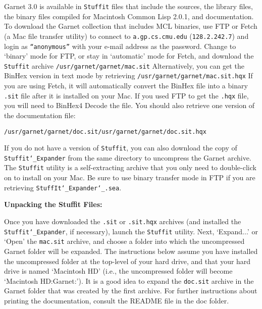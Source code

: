 \documentclass{report}
\begin{document}
Garnet 3.0 is available in \texttt{Stuffit} files that include the
sources, the library files, the binary files compiled for Macintosh
Common Lisp 2.0.1, and documentation.  To download the Garnet
collection that includes MCL binaries, use FTP or Fetch (a Mac file
transfer utility) to connect to \texttt{a.gp.cs.cmu.edu}
(\texttt{128.2.242.7}) and login as \texttt{``anonymous''} with your e-mail
address as the password.  Change to `binary' mode for FTP, or stay in
`automatic' mode for Fetch, and download the \texttt{Stuffit} archive
\texttt{/usr/garnet/garnet/mac.sit} Alternatively, you can get
the BinHex version in text mode by retrieving
\texttt{/usr/garnet/garnet/mac.sit.hqx} If you are using
Fetch, it will automatically convert the BinHex file into a binary
\texttt{.sit} file after it is installed on your Mac.  If you used FTP to
get the \texttt{.hqx} file, you will need to BinHex4 Decode the file.  You
should also retrieve one version of the documentation file:
\begin{alltt}
  /usr/garnet/garnet/doc.sit /usr/garnet/garnet/doc.sit.hqx
\end{alltt}

If you do not have a version of \texttt{Stuffit}, you can also download
the copy of \texttt{Stuffit{\tt\char`\_}Expander} from the same directory
to uncompress the Garnet archive.  The \texttt{Stuffit} utility is a
self-extracting archive that you only need to double-click on to
install on your Mac.  Be sure to use binary transfer mode in FTP if
you are retrieving \texttt{StuffIt{\tt\char`\_}Expander{\tt\char`\_}.sea}.

  {\bf Unpacking the Stuffit Files:}
  
  Once you have downloaded the \texttt{.sit} or \texttt{.sit.hqx} archives
  (and installed the \texttt{Stuffit{\tt\char`\_}Expander}, if necessary),
  launch the \texttt{Stuffit} utility.  Next, `Expand...' or `Open' the
  \texttt{mac.sit} archive, and choose a folder into which the
  uncompressed Garnet folder will be expanded.  The instructions below
  assume you have installed the uncompressed folder at the top-level
  of your hard drive, and that your hard drive is named `Macintosh HD'
  (i.e., the uncompressed folder will become `Macintosh HD:Garnet:').
  It is a good idea to expand the \texttt{doc.sit} archive in the Garnet
  folder that was created by the first archive.  For further
  instructions about printing the documentation, consult the README
  file in the doc folder.
\end{document}

